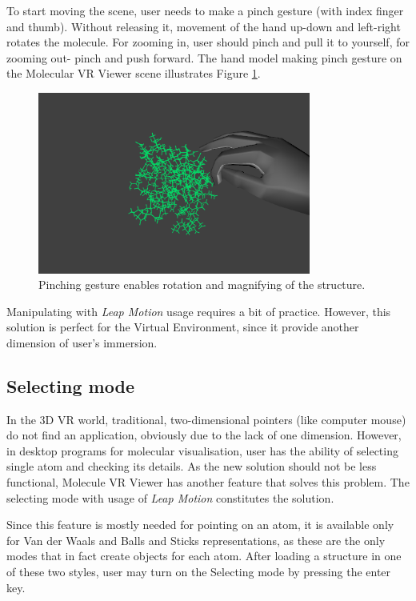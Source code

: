 To start moving the scene, user needs to make a pinch gesture (with index finger and thumb). Without releasing it, movement of the hand up-down and left-right rotates the molecule. For zooming in, user should pinch and pull it to yourself, for zooming out- pinch and push forward. The hand model making pinch gesture on the Molecular VR Viewer scene illustrates Figure \ref{fig:pinch}.    

\begin{figure}[!htb]
\centering    
\includegraphics[width=0.8\textwidth]{Figs/pinch.png}
\caption{Pinching gesture enables rotation and magnifying of the structure.}
\label{fig:pinch} 
\end{figure}

Manipulating with \textit{Leap Motion} usage requires a bit of practice. However, this solution is perfect for the Virtual Environment, since it provide another dimension of user's immersion.

\subsection{Selecting mode}

In the 3D VR world, traditional, two-dimensional pointers (like computer mouse) do not find an application, obviously due to the lack of one dimension. However, in desktop programs for molecular visualisation, user has the ability of selecting single atom and checking its details. As the new solution should not be less functional, Molecule VR Viewer has another feature that solves this problem. The selecting mode with usage of \textit{Leap Motion} constitutes the solution.

Since this feature is mostly needed for pointing on an atom, it is available only for Van der Waals and Balls and Sticks representations, as these are the only modes that in fact create objects for each atom. After loading a structure in one of these two styles, user may turn on the Selecting mode by pressing the enter key.

